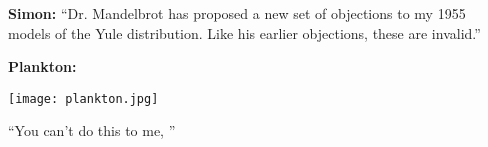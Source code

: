  \textbf{Simon:}
    ``Dr. Mandelbrot has proposed a new set of objections to my 1955
    models of the Yule distribution.  Like his earlier objections,
    these are invalid.''\cite{simon1961a}
  

      
    
    \textbf{Plankton:}
      \smallskip
              
        \texttt{[image: plankton.jpg]}
        
        {
          ``You can't do this to me, ''
        }
          
  




